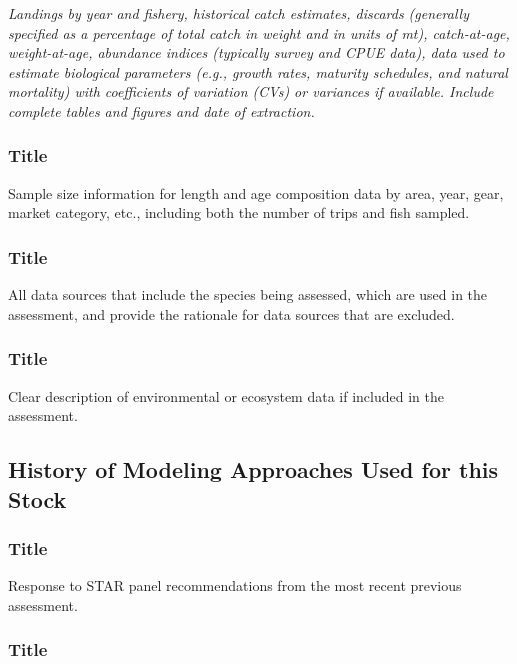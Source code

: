\documentclass[12pt,]{article}
\begin{document}
\emph{Landings by year and fishery, historical catch estimates, discards
(generally specified as a percentage of total catch in weight and in
units of mt), catch-at-age, weight-at-age, abundance indices (typically
survey and CPUE data), data used to estimate biological parameters
(e.g., growth rates, maturity schedules, and natural mortality) with
coefficients of variation (CVs) or variances if available. Include
complete tables and figures and date of extraction.}

\subsubsection{Title}\label{title}

Sample size information for length and age composition data by area,
year, gear, market category, etc., including both the number of trips
and fish sampled.

\subsubsection{Title}\label{title-1}

All data sources that include the species being assessed, which are used
in the assessment, and provide the rationale for data sources that are
excluded.

\subsubsection{Title}\label{title-2}

Clear description of environmental or ecosystem data if included in the
assessment.

\subsection{History of Modeling Approaches Used for this
Stock}\label{history-of-modeling-approaches-used-for-this-stock}

\subsubsection{Title}\label{title-3}

Response to STAR panel recommendations from the most recent previous
assessment.

\subsubsection{Title}\label{title-4}
\end{document}
